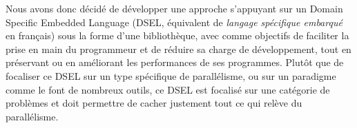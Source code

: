 Nous avons donc décidé de développer une approche s'appuyant sur un Domain Specific Embedded Language (DSEL, équivalent de \emph{langage spécifique embarqué} en français) sous la forme d'une bibliothèque, avec comme objectifs de faciliter la prise en main du programmeur et de réduire sa charge de développement, tout en préservant ou en améliorant les performances de ses programmes.
Plutôt que de focaliser ce DSEL sur un type spécifique de parallélisme, ou sur un paradigme comme le font de nombreux outils, ce DSEL est focalisé sur une catégorie de problèmes et doit permettre de cacher justement tout ce qui relève du parallélisme.



